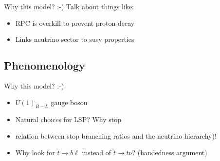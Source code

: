 {\color{red} Why this model? :-) Talk about things like:
\begin{itemize}
\item RPC is overkill to prevent proton decay
\item Links neutrino sector to susy properties
\end{itemize}
}

\subsection{Phenomenology}

{\color{red} Why this model? :-)
\begin{itemize}
\item $U(1)_{B-L}$ gauge boson
\item Natural choices for LSP? Why stop
\item relation between stop branching ratios and the neutrino hierarchy)!
\item Why look for $\tilde{t} \rightarrow b\ell$ instead of
  $\tilde{t} \rightarrow t\nu$? (handedness argument)
\end{itemize}
}


